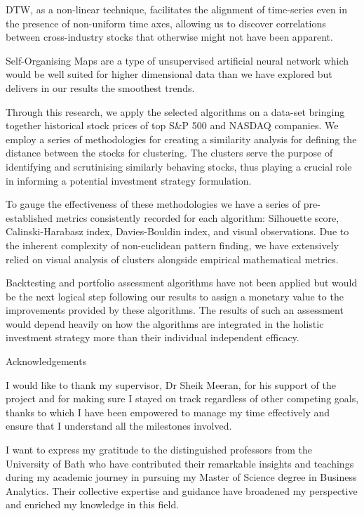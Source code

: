 \documentclass[11pt]{article}
\begin{document}
DTW, as a non-linear technique, facilitates the alignment of time-series even in the presence of non-uniform time axes, allowing us to discover correlations between cross-industry stocks that otherwise might not have been apparent.

Self-Organising Maps are a type of unsupervised artificial neural network which would be well suited for higher dimensional data than we have explored but delivers in our results the smoothest trends.

Through this research, we apply the selected algorithms on a data-set bringing together historical stock prices of top S\&P 500 and NASDAQ companies. We employ a series of methodologies for creating a similarity analysis for defining the distance between the stocks for clustering. The clusters serve the purpose of identifying and scrutinising similarly behaving stocks, thus playing a crucial role in informing a potential investment strategy formulation.

To gauge the effectiveness of these methodologies we have a series of pre-established metrics consistently recorded for each algorithm: Silhouette score, Calinski-Harabasz index, Davies-Bouldin index, and visual observations. Due to the inherent complexity of non-euclidean pattern finding, we have extensively relied on visual analysis of clusters alongside empirical mathematical metrics.

Backtesting and portfolio assessment algorithms have not been applied but would be the next logical step following our results to assign a monetary value to the improvements  provided by these algorithms. The results of such an assessment would depend heavily on how the algorithms are integrated in the holistic investment strategy more than their individual independent efficacy.


\newpage

\begin{center} {\LARGE Acknowledgements} \end{center}

I would like to thank my supervisor, Dr Sheik Meeran, for his support of the project and for making sure I stayed on track regardless of other competing goals, thanks to which I have been empowered to manage my time effectively and ensure that I understand all the milestones involved.

 I want to express my gratitude to the distinguished professors from the University of Bath who have contributed their remarkable insights and teachings during my academic journey in pursuing my Master of Science degree in Business Analytics. Their collective expertise and guidance have broadened my perspective and enriched my knowledge in this field.
\end{document}
